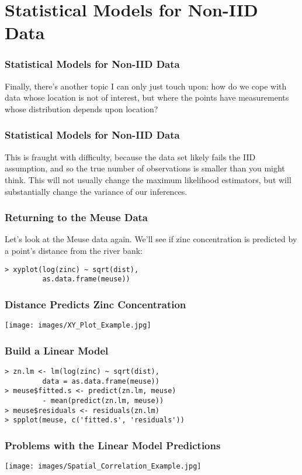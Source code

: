 \documentclass{beamer}
\begin{document}
\section{Statistical Models for Non-IID Data}

\frame
{
	\frametitle{Statistical Models for Non-IID Data}

	Finally, there's another topic I can only just touch upon: how do we cope with data whose location is not of interest, but where the points have measurements whose distribution depends upon location?
}

\frame
{
	\frametitle{Statistical Models for Non-IID Data}

	This is fraught with difficulty, because the data set likely fails the IID assumption, and so the true number of observations is smaller than you might think. This will not usually change the maximum likelihood estimators, but will substantially change the variance of our inferences.
}

\begin{frame}[fragile]
	\frametitle{Returning to the Meuse Data}

	Let's look at the Meuse data again. We'll see if zinc concentration is predicted by a point's distance from the river bank:
	
	\begin{verbatim}
> xyplot(log(zinc) ~ sqrt(dist),
         as.data.frame(meuse))
	\end{verbatim}
\end{frame}

\frame
{
	\frametitle{Distance Predicts Zinc Concentration}

	\begin{center}
		\texttt{[image: images/XY\_Plot\_Example.jpg]}
	\end{center}
}

\begin{frame}[fragile]
	\frametitle{Build a Linear Model}
	
	\begin{verbatim}
> zn.lm <- lm(log(zinc) ~ sqrt(dist),
         data = as.data.frame(meuse))
> meuse$fitted.s <- predict(zn.lm, meuse)
         - mean(predict(zn.lm, meuse))
> meuse$residuals <- residuals(zn.lm)
> spplot(meuse, c('fitted.s', 'residuals'))
	\end{verbatim}
\end{frame}

\frame
{
	\frametitle{Problems with the Linear Model Predictions}

	\begin{center}
		\texttt{[image: images/Spatial\_Correlation\_Example.jpg]}
	\end{center}
}
\end{document}
